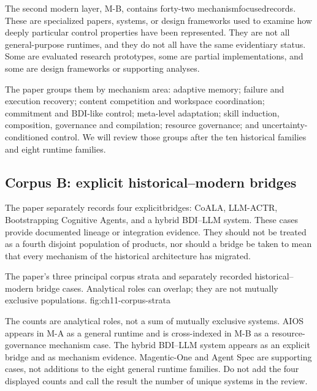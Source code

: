 The second modern layer, M-B, contains forty-two \glspl{mechanismfocusedrecord}. These are specialized papers, systems, or design frameworks used to examine how deeply particular control properties have been represented. They are not all general-purpose runtimes, and they do not all have the same evidentiary status. Some are evaluated research prototypes, some are partial implementations, and some are design frameworks or supporting analyses.

The paper groups them by mechanism area: adaptive memory; failure and execution recovery; content competition and workspace coordination; commitment and BDI-like control; meta-level adaptation; skill induction, composition, governance and compilation; resource governance; and uncertainty-conditioned control. We will review those groups after the ten historical families and eight runtime families.

\subsection{Corpus B: explicit historical--modern bridges}

The paper separately records four \glspl{explicitbridge}: CoALA, LLM-ACTR, Bootstrapping Cognitive Agents, and a hybrid BDI--LLM system. These cases provide documented lineage or integration evidence. They should not be treated as a fourth disjoint population of products, nor should a bridge be taken to mean that every mechanism of the historical architecture has migrated.

  {The paper's three principal corpus strata and separately recorded historical--modern bridge cases. Analytical roles can overlap; they are not mutually exclusive populations.}
  {fig:ch11-corpus-strata}

\begin{notebox}
The counts are analytical roles, not a sum of mutually exclusive systems. AIOS appears in M-A as a general runtime and is cross-indexed in M-B as a resource-governance mechanism case. The hybrid BDI--LLM system appears as an explicit bridge and as mechanism evidence. Magentic-One and Agent Spec are supporting cases, not additions to the eight general runtime families. Do not add the four displayed counts and call the result the number of unique systems in the review.
\end{notebox}


